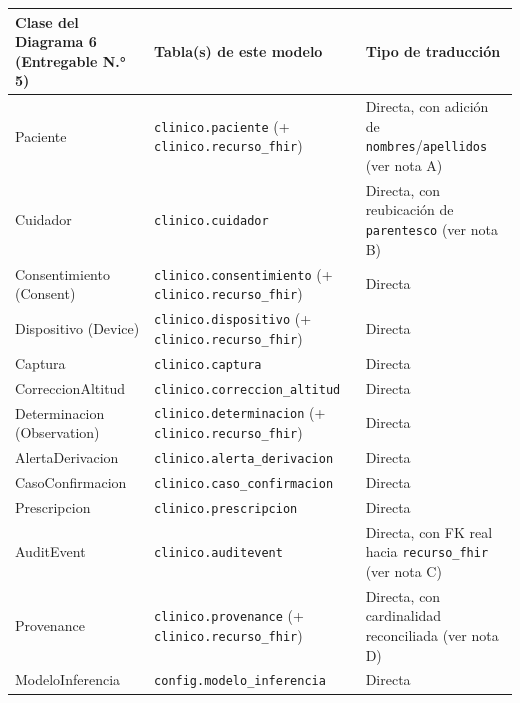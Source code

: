 \documentclass[11pt,a4paper]{article}
\begin{document}
{\small
\begin{longtable}[]{@{}
  >{\raggedright\arraybackslash}p{}
  >{\raggedright\arraybackslash}p{}
  >{\raggedright\arraybackslash}p{}@{}}
\toprule\noalign{}
\begin{minipage}[b]{\linewidth}\raggedright
Clase del Diagrama 6 (Entregable N.° 5)
\end{minipage} & \begin{minipage}[b]{\linewidth}\raggedright
Tabla(s) de este modelo
\end{minipage} & \begin{minipage}[b]{\linewidth}\raggedright
Tipo de traducción
\end{minipage} \\
\midrule\noalign{}
\endhead
\bottomrule\noalign{}
\endlastfoot
Paciente & \texttt{clinico.paciente} (+ \texttt{clinico.recurso\_fhir}) & Directa, con adición de \texttt{nombres}/\texttt{apellidos} (ver nota A) \\
Cuidador & \texttt{clinico.cuidador} & Directa, con reubicación de \texttt{parentesco} (ver nota B) \\
Consentimiento (Consent) & \texttt{clinico.consentimiento} (+ \texttt{clinico.recurso\_fhir}) & Directa \\
Dispositivo (Device) & \texttt{clinico.dispositivo} (+ \texttt{clinico.recurso\_fhir}) & Directa \\
Captura & \texttt{clinico.captura} & Directa \\
CorreccionAltitud & \texttt{clinico.correccion\_altitud} & Directa \\
Determinacion (Observation) & \texttt{clinico.determinacion} (+ \texttt{clinico.recurso\_fhir}) & Directa \\
AlertaDerivacion & \texttt{clinico.alerta\_derivacion} & Directa \\
CasoConfirmacion & \texttt{clinico.caso\_confirmacion} & Directa \\
Prescripcion & \texttt{clinico.prescripcion} & Directa \\
AuditEvent & \texttt{clinico.auditevent} & Directa, con FK real hacia \texttt{recurso\_fhir} (ver nota C) \\
Provenance & \texttt{clinico.provenance} (+ \texttt{clinico.recurso\_fhir}) & Directa, con cardinalidad reconciliada (ver nota D) \\
ModeloInferencia & \texttt{config.modelo\_inferencia} & Directa \\

\end{longtable}}
\end{document}
